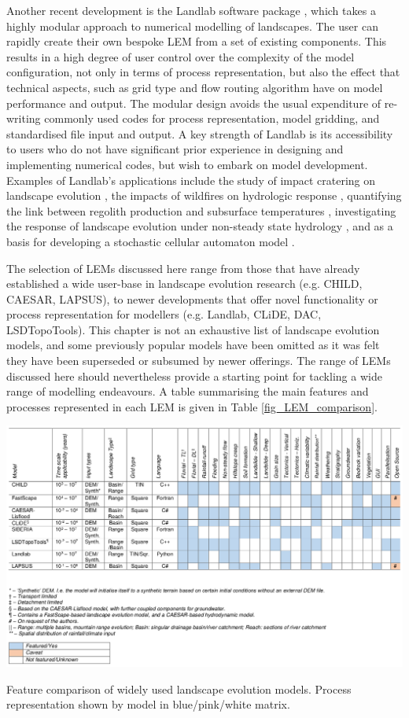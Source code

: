 Another recent development is the Landlab software package \citep{hobley2017creative}, which takes a highly modular approach to numerical modelling of landscapes. The user can rapidly create their own bespoke LEM from a set of existing components. This results in a high degree of user control over the complexity of the model configuration, not only in terms of process representation, but also the effect that technical aspects, such as grid type and flow routing algorithm have on model performance and output. The modular design avoids the usual expenditure of re-writing commonly used codes for process representation, model gridding, and standardised file input and output. A key strength of Landlab is its accessibility to users who do not have significant prior experience in designing and implementing numerical codes, but wish to embark on model development. Examples of Landlab's applications include the study of impact cratering on landscape evolution \citep{hobley2013modeling}, the impacts of wildfires on hydrologic response \citep{adams2017landlab}, quantifying the link between regolith production and subsurface temperatures \citep{barnhart2014chilly}, investigating the response of landscape evolution under non-steady state hydrology \citep{adams2017landlab}, and as a basis for developing a stochastic cellular automaton model \citep{Tucker2015}.

The selection of LEMs discussed here range from those that have already established a wide user-base in landscape evolution research (e.g. CHILD, CAESAR, LAPSUS), to newer developments that offer novel functionality or process representation for modellers (e.g. Landlab, CLiDE, DAC, LSDTopoTools). This chapter is not an exhaustive list of landscape evolution models, and some previously popular models have been omitted as it was felt they have been superseded or subsumed by newer offerings. The range of LEMs discussed here should nevertheless provide a starting point for tackling a wide range of modelling endeavours. A table summarising the main features and processes represented in each LEM is given in Table \ref{fig_LEM_comparison}.

\begin{table}
\includegraphics[width=24cm]{LEMFinalRevisedmanuscriptDAVFinalrevisions-img/table_lems_comparison.png} 
\caption{Feature comparison of widely used landscape evolution models. Process representation shown by model in blue/pink/white matrix.}
\label{fig_LEM_comparison}
\end{table}

